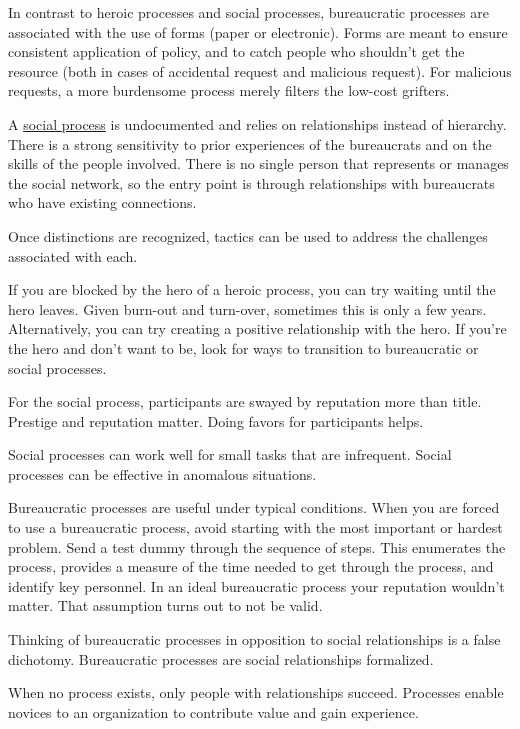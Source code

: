 In contrast to heroic processes and social processes, bureaucratic processes are associated with the use of forms (paper or electronic). 
Forms are meant to ensure consistent application of policy, and to catch people who shouldn't get the resource (both in cases of accidental request and malicious request). For malicious requests, a more burdensome process merely filters the low-cost grifters. 


A \underline{social process} is undocumented and relies on relationships instead of hierarchy. There is a strong sensitivity to prior experiences of the bureaucrats and on the skills of the people involved. There is no single person that represents or manages the social network, so the entry point is through relationships with bureaucrats who have existing connections.

Once distinctions are recognized, tactics can be used to address the challenges associated with each.

If you are blocked by the hero of a heroic process, you can try waiting until the hero leaves. Given burn-out and turn-over, sometimes this is only a few years. Alternatively, you can try creating a positive relationship with the hero.  If you're the hero and don't want to be, look for ways to transition to bureaucratic or social processes. 


For the social process, participants are swayed by reputation more than title. Prestige and reputation matter. Doing favors for participants helps.

Social processes can work well for small tasks that are infrequent.
Social processes can be effective in anomalous situations.

Bureaucratic processes are useful under typical conditions.
When you are forced to use a bureaucratic process, avoid starting with the most important or hardest problem. Send a test dummy through the sequence of steps. This enumerates the process, provides a measure of the time needed to get through the process, and identify key personnel. In an ideal bureaucratic process your reputation wouldn't matter. That assumption turns out to not be valid. 

Thinking of bureaucratic processes in opposition to social relationships is a false dichotomy. Bureaucratic processes are social relationships formalized.



When no process exists, only people with relationships succeed. Processes enable novices to an organization to contribute value and gain experience. 




